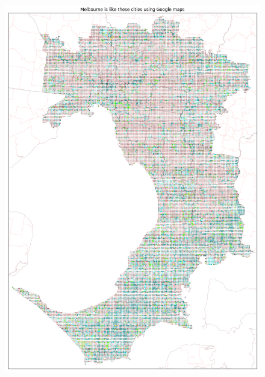 \documentclass[sageh,times]{sagej}
\begin{document}
  
\begin{figure}[!htbp]
\centering    
\includegraphics[scale=0.20]{Images/MelbourneOverall_maps.png} 

\end{figure}
\end{document}

